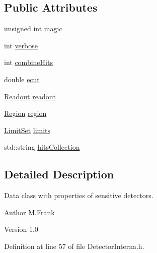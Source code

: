 \subsection*{Public Attributes}
\begin{DoxyCompactItemize}
\item 
unsigned int \hyperlink{class_d_d4hep_1_1_geometry_1_1_sensitive_detector_object_aa4d14ed3d51869d676732f3f19769baa}{magic}
\item 
int \hyperlink{class_d_d4hep_1_1_geometry_1_1_sensitive_detector_object_aeb8289c1e8386dcf52041d1bae827cfa}{verbose}
\item 
int \hyperlink{class_d_d4hep_1_1_geometry_1_1_sensitive_detector_object_aec18ccc329468200900de0fabf900e76}{combineHits}
\item 
double \hyperlink{class_d_d4hep_1_1_geometry_1_1_sensitive_detector_object_a1c51c612aaac8b1ae21daf7030f0659a}{ecut}
\item 
\hyperlink{class_d_d4hep_1_1_geometry_1_1_readout}{Readout} \hyperlink{class_d_d4hep_1_1_geometry_1_1_sensitive_detector_object_a2bdcbb790c3ef059c619c250e082688d}{readout}
\item 
\hyperlink{class_d_d4hep_1_1_geometry_1_1_region}{Region} \hyperlink{class_d_d4hep_1_1_geometry_1_1_sensitive_detector_object_a022b7c934478f9778969ab16629d93c6}{region}
\item 
\hyperlink{class_d_d4hep_1_1_geometry_1_1_limit_set}{LimitSet} \hyperlink{class_d_d4hep_1_1_geometry_1_1_sensitive_detector_object_a46aaaef7d8eaba09dc9f7cc77c903d40}{limits}
\item 
std::string \hyperlink{class_d_d4hep_1_1_geometry_1_1_sensitive_detector_object_abf517c287f2744812828ba3e7c12a4f1}{hitsCollection}
\end{DoxyCompactItemize}


\subsection{Detailed Description}
Data class with properties of sensitive detectors. \begin{DoxyAuthor}{Author}
M.Frank 
\end{DoxyAuthor}
\begin{DoxyVersion}{Version}
1.0 
\end{DoxyVersion}


Definition at line 57 of file DetectorInterna.h.

